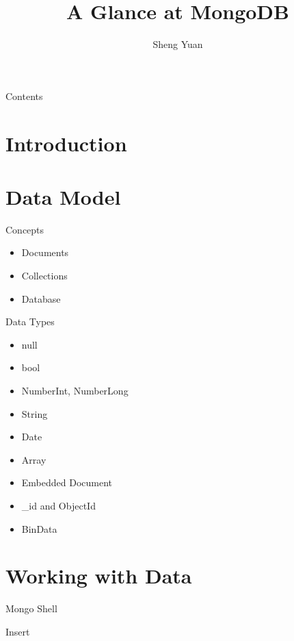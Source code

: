 \documentclass{beamer}
\title{A Glance at MongoDB}
\author{Sheng Yuan}
\begin{document}
    
\begin{frame}
    \titlepage
\end{frame}

\begin{frame}{Contents}
    \tableofcontents
\end{frame}

\section{Introduction}
\begin{frame}
    
\end{frame}

\section{Data Model}
\begin{frame}{Concepts}
\begin{itemize}
    \item Documents
    \item Collections
    \item Database
\end{itemize}
\end{frame}

\begin{frame}{Data Types}
    \begin{itemize}
        \item null
        \item bool
        \item NumberInt, NumberLong
        \item String
        \item Date
        \item Array
        \item Embedded Document
        \item \_id and ObjectId
        \item BinData
    \end{itemize}
\end{frame}

\section{Working with Data}
\begin{frame}{Mongo Shell}
    
\end{frame}

\begin{frame}{Insert}

\end{frame}
\end{document}
